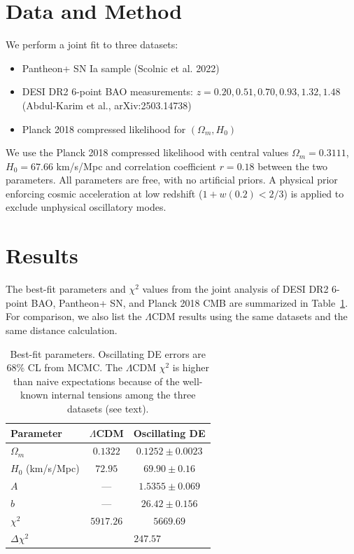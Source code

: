 \documentclass[10pt,twocolumn]{article}
\begin{document}
\section{Data and Method}
We perform a joint fit to three datasets:
\begin{itemize}
\item Pantheon+ SN Ia sample (Scolnic et al. 2022)
\item DESI DR2 6-point BAO measurements: $z=0.20,0.51,0.70,0.93,1.32,1.48$ (Abdul-Karim et al., arXiv:2503.14738)
\item Planck 2018 compressed likelihood for $(\Omega_m, H_0)$
\end{itemize}
We use the Planck 2018 compressed likelihood with central values
$\Omega_m=0.3111$, $H_0=67.66$ km/s/Mpc
and correlation coefficient $r=0.18$ between the two parameters.
All parameters are free, with no artificial priors.
A physical prior enforcing cosmic acceleration at low redshift ($1+w(0.2)<2/3$) is applied to exclude unphysical oscillatory modes.

\section{Results}
The best-fit parameters and $\chi^2$ values from the joint analysis of DESI DR2 6-point BAO, Pantheon+ SN, and Planck 2018 CMB are summarized in Table~\ref{tab:bestfit}. For comparison, we also list the $\Lambda$CDM results using the same datasets and the same distance calculation.

\begin{table}[htbp]
\centering
\caption{Best-fit parameters. Oscillating DE errors are 68\% CL from MCMC. The $\Lambda$CDM $\chi^2$ is higher than naive expectations because of the well-known internal tensions among the three datasets (see text).}
\begin{tabular}{lcc}
\hline
Parameter & $\Lambda$CDM & Oscillating DE \\
\hline
$\Omega_m$    & $0.1322$ & $0.1252\pm0.0023$ \\
$H_0$ (km/s/Mpc) & $72.95$ & $69.90\pm0.16$ \\
$A$           & --- & $1.5355\pm0.069$ \\
$b$           & --- & $26.42\pm0.156$ \\
$\chi^2$      & $5917.26$ & $5669.69$ \\
$\Delta\chi^2$& \multicolumn{2}{c}{$247.57$} \\
\hline
\end{tabular}
\label{tab:bestfit}
\end{table}
\end{document}
